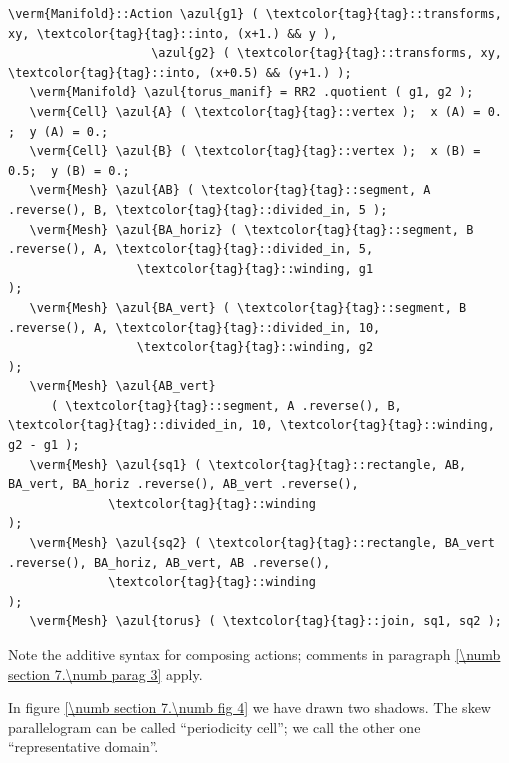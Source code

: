 \begin{Verbatim}[commandchars=\\\{\},formatcom=\small\tt,frame=single,
   label=parag-\ref{\numb section 7.\numb parag 8}.cpp,rulecolor=\color{coment},
   baselinestretch=0.94,framesep=2mm                                            ]
   \verm{Manifold}::Action \azul{g1} ( \textcolor{tag}{tag}::transforms, xy, \textcolor{tag}{tag}::into, (x+1.) && y ),
                    \azul{g2} ( \textcolor{tag}{tag}::transforms, xy, \textcolor{tag}{tag}::into, (x+0.5) && (y+1.) );
   \verm{Manifold} \azul{torus_manif} = RR2 .quotient ( g1, g2 );
   \verm{Cell} \azul{A} ( \textcolor{tag}{tag}::vertex );  x (A) = 0. ;  y (A) = 0.;
   \verm{Cell} \azul{B} ( \textcolor{tag}{tag}::vertex );  x (B) = 0.5;  y (B) = 0.;
   \verm{Mesh} \azul{AB} ( \textcolor{tag}{tag}::segment, A .reverse(), B, \textcolor{tag}{tag}::divided_in, 5 );
   \verm{Mesh} \azul{BA_horiz} ( \textcolor{tag}{tag}::segment, B .reverse(), A, \textcolor{tag}{tag}::divided_in, 5,
                  \textcolor{tag}{tag}::winding, g1                                  );
   \verm{Mesh} \azul{BA_vert} ( \textcolor{tag}{tag}::segment, B .reverse(), A, \textcolor{tag}{tag}::divided_in, 10,
                  \textcolor{tag}{tag}::winding, g2                                  );
   \verm{Mesh} \azul{AB_vert}
      ( \textcolor{tag}{tag}::segment, A .reverse(), B, \textcolor{tag}{tag}::divided_in, 10, \textcolor{tag}{tag}::winding, g2 - g1 );
   \verm{Mesh} \azul{sq1} ( \textcolor{tag}{tag}::rectangle, AB, BA_vert, BA_horiz .reverse(), AB_vert .reverse(),
              \textcolor{tag}{tag}::winding                                                        );
   \verm{Mesh} \azul{sq2} ( \textcolor{tag}{tag}::rectangle, BA_vert .reverse(), BA_horiz, AB_vert, AB .reverse(),
              \textcolor{tag}{tag}::winding                                                        );
   \verm{Mesh} \azul{torus} ( \textcolor{tag}{tag}::join, sq1, sq2 );
\end{Verbatim}

Note the additive syntax for composing actions; comments in paragraph
\ref{\numb section 7.\numb parag 3} apply.

In figure \ref{\numb section 7.\numb fig 4} we have drawn two shadows.
The skew parallelogram can be called ``periodicity cell'';
we call the other one ``representative domain''.

